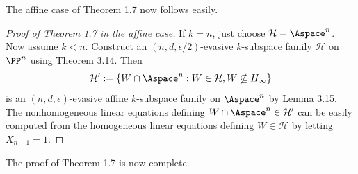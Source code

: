 The affine case of Theorem 1.7 now follows easily.
\begin{proof}[Proof of Theorem 1.7 in the affine case]
If $k=n$, just choose $\mathcal H=\Aspace^n$. Now assume $k<n$. Construct an $(n,d,\epsilon/2)$-evasive $k$-subspace family $\mathcal H$ on $\PP^n$ using Theorem 3.14. Then
\[\mathcal H':=\{W\cap\Aspace^n:W\in\mathcal H,W\not\subseteq H_\infty\}\]
is an $(n,d,\epsilon)$-evasive affine $k$-subspace family on $\Aspace^n$ by Lemma 3.15. The nonhomogeneous linear equations defining $W\cap\Aspace^n\in\mathcal H'$ can be easily computed from the homogeneous linear equations defining $W\in\mathcal H$ by letting $X_{n+1}=1$.
\end{proof}
The proof of Theorem 1.7 is now complete.
